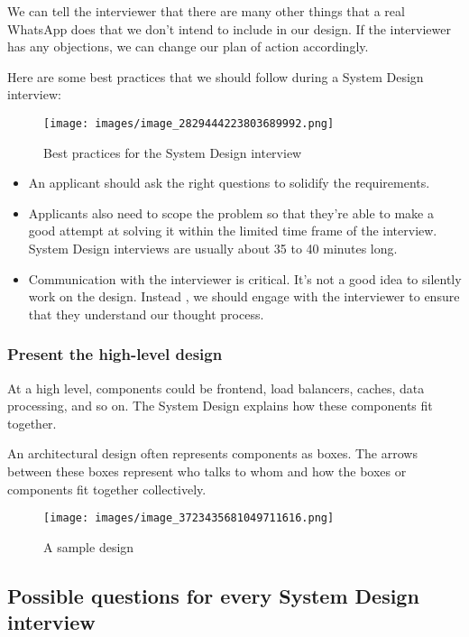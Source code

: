 We can tell the interviewer that there are many other things that a real WhatsApp does that we don't intend to include in our design. If the interviewer has any objections, we can change our plan of action accordingly.

Here are some best practices that we should follow during a System Design interview:

\begin{figure}[htbp]
 \centering
 \texttt{[image: images/image\_2829444223803689992.png]}
 \caption{Best practices for the System Design interview}
\end{figure}

\begin{itemize}
\item
{}\label{BkHabk7AURmxR6IR-ch_a}
An applicant should ask the right questions to solidify the requirements.
\item
{}\label{tMnQnmcrx93uB5IFGVFMX}
Applicants also need to scope the problem so that they're able to make a good attempt at solving it within the limited time frame of the interview. System Design interviews are usually about 35 to 40 minutes long.
\item
{}\label{CncjPzeO-3fVJ2QM2o_ip}
Communication with the interviewer is critical. It's not a good idea to silently work on the design. Instead , we should engage with the interviewer to ensure that they understand our thought process.
\end{itemize}

\subsubsection{Present the high-level design}\label{RwSzNg6izH6FhCXOl7kS4}

At a high level, components could be frontend, load balancers, caches, data processing, and so on. The System Design explains how these components fit together.

An architectural design often represents components as boxes. The arrows between these boxes represent who talks to whom and how the boxes or components fit together collectively.

\begin{figure}[htbp]
 \centering
 \texttt{[image: images/image\_3723435681049711616.png]}
 \caption{A sample design}
\end{figure}

\subsection{Possible questions for every System Design interview}\label{N0oqEUUvDaJbCsC9k12Oe}

